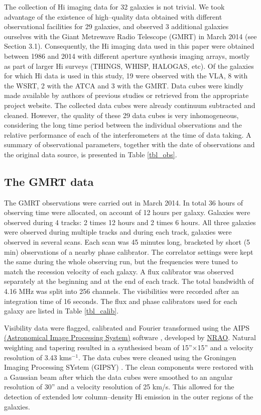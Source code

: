 \documentclass[usenatbib,useAMS]{mnras}
\begin{document}
The collection of H{\sc i} imaging data for 32 galaxies is not trivial. 
We took advantage of the existence of high--quality data obtained with
different observational facilities for 29 galaxies, and observed 3
additional galaxies ourselves with the Giant Metrewave Radio Telescope
(GMRT) in March 2014 (see Section 3.1).  Consequently, the H{\sc i}
imaging data used in this paper were obtained between 1986 and 2014 with
different aperture synthesis imaging arrays, mostly as part of larger
H{\sc i} surveys (THINGS, WHISP, HALOGAS, etc).  Of the galaxies for
which H{\sc i} data is used in this study, 19 were observed with the
VLA, 8 with the WSRT, 2 with the ATCA and 3 with the GMRT.  Data cubes
were kindly made available by authors of previous studies or retrieved
from the appropriate project website.  The collected data cubes were
already continuum subtracted and cleaned.  However, the quality of
these 29 data cubes is very inhomogeneous, considering the long time
period between the individual observations and the relative performance
of each of the interferometers at the time of data taking.  A summary of
observational parameters, together with the date of observations and the
original data source, is presented in Table \ref{tbl_obs}. 

\subsection{The GMRT data} 

The GMRT observations were carried out in March 2014.  In total 36 hours
of observing time were allocated, on account of 12 hours per galaxy. 
Galaxies were observed during 4 tracks: 2 times 12 hours and 2 times 6
hours.  All three galaxies were observed during multiple tracks and
during each track, galaxies were observed in several scans.  Each scan
was 45 minutes long, bracketed by short (5 min) observations of a nearby
phase calibrator.  The correlator settings were kept the same during the
whole observing run, but the frequencies were tuned to match the
recession velocity of each galaxy.  A flux calibrator was observed
separately at the beginning and at the end of each track.  The total
bandwidth of 4.16 MHz was split into 256 channels.  The visibilities
were recorded after an integration time of 16 seconds.  The flux and
phase calibrators used for each galaxy are listed in Table
\ref{tbl_calib}. 

Visibility data were flagged, calibrated and Fourier transformed using
the AIPS \href{http://www.aips.nrao.edu/index.shtml}{ (Astronomical
Image Processing System)} software \citep{aips}, developed by
\href{http://www.nrao.edu/}{NRAO}.  Natural weighting and tapering
resulted in a synthesised beam of 15''$\times$15'' and a velocity
resolution of 3.43 kms$^{-1}$.  The data cubes were cleaned using the
Groningen Imaging Processing SYstem (GIPSY) \citep{gipsy}.  The clean
components were restored with a Gaussian beam after which the data cubes
were smoothed to an angular resolution of 30'' and a velocity resolution
of 25 km/s.  This allowed for the detection of extended low
column--density H{\sc i} emission in the outer regions of the galaxies. 
\end{document}
